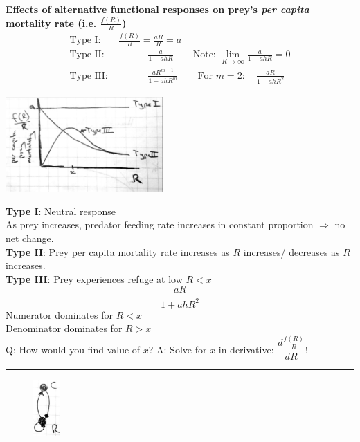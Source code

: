 \documentclass{article}
\newcommand{\note}[1]{\colorbox{gray!30}{#1}}
\newcommand{\ind}{\-\hspace{1cm}}
\begin{document}
\textbf{Effects of alternative functional responses on prey's \emph{per capita} mortality rate (i.e. $\frac{f(R)}{R}$)}
\begin{align*}
	\text{Type I: } &\frac{f(R)}{R}=\frac{aR}{R}=a \\
	\text{Type II: } & \quad \qquad \frac{a}{1+ahR} \quad \quad \text{Note: }\lim_{R \to \infty}\frac{a}{1+ahR}=0\\
	\text{Type III: } &  \qquad \quad \frac{aR^{m-1}}{1+ahR^m} \quad \quad \text{For }m=2: \quad \frac{aR}{1+ahR^2}
\end{align*}
\begin{center}
\includegraphics[width=6cm]{figs/PreyMort.pdf}
\end{center}

\textbf{Type I}: Neutral response\\
\ind \ind As prey increases, predator feeding rate increases in constant proportion $\Rightarrow$ no net change.\\
\textbf{Type II}: Prey per capita mortality rate increases as $R$ increases/ decreases as $R$ increases.\\
\textbf{Type III}: Prey experiences refuge at low $R < x$
\begin{equation*}
\frac{a  R}{1+ahR^2}
\end{equation*}
\ind \ind \ind Numerator dominates for $R<x$\\
\ind \ind \ind Denominator dominates for $R>x$\\

\note{Q:} How would you find value of $x$?
\note{A:} Solve for $x$ in derivative: $\dfrac{d \frac{f(R)}{R}}{dR}$!

\rule[0.5ex]{\linewidth}{1pt}

\begin{figure}
\includegraphics[width=1cm]{figs/CR_digraph2.pdf}
\end{figure}
\end{document}
